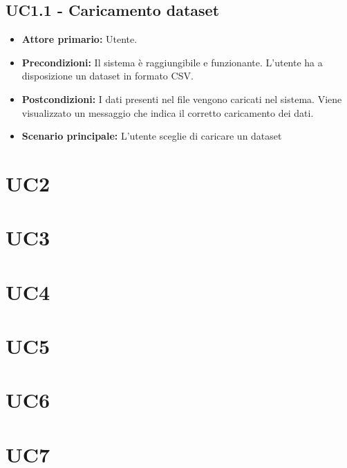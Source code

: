 \subsection{UC1.1 - Caricamento dataset}
\begin{itemize}
  \item \textbf{Attore primario:} Utente.
  \item \textbf{Precondizioni:} Il sistema è raggiungibile e funzionante. L’utente ha a disposizione un dataset in formato CSV.
  \item \textbf{Postcondizioni:} I dati presenti nel file vengono caricati nel sistema. Viene visualizzato un messaggio che indica il corretto caricamento dei dati.
  \item \textbf{Scenario principale:} L'utente sceglie di caricare un dataset 
\end{itemize}
\section{UC2}

\section{UC3}

\section{UC4}

\section{UC5}

\section{UC6}

\section{UC7}
